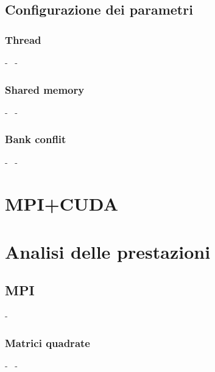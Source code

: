 \documentclass[compress]{beamer}
\begin{document}
\subsection{Configurazione dei parametri}
\subsubsection*{Thread}
\begin{frame}{\secname \text{ }- \subsecname\ \text{ }- \subsubsecname}
\end{frame}

\subsubsection*{Shared memory}
\begin{frame}{\secname \text{ }- \subsecname\ \text{ }- \subsubsecname}
\end{frame}

\subsubsection*{Bank conflit}
\begin{frame}{\secname \text{ }- \subsecname\ \text{ }- \subsubsecname}
\end{frame}

\section{MPI+CUDA}

\begin{frame}{\secname}
\end{frame}

\section{Analisi delle prestazioni}

\subsection{MPI}
\begin{frame}{\secname \text{ }- \subsecname\ }
\end{frame}

\subsubsection*{Matrici quadrate}
\begin{frame}{\secname \text{ }- \subsecname\ \text{ }- \subsubsecname}
\end{frame}
\end{document}
